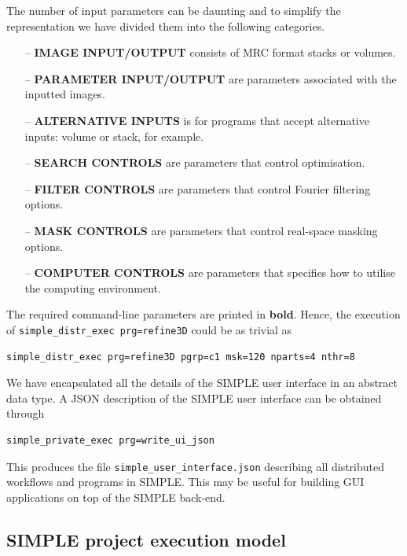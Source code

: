 \documentclass[a4paper,11pt]{article}
\begin{document}
\noindent{}The number of input parameters can be daunting and to simplify the representation we have divided them into the following categories.

\begin{itemize}
    \item[--] \textbf{IMAGE INPUT/OUTPUT} consists of MRC format stacks or volumes.
    \item[--] \textbf{PARAMETER INPUT/OUTPUT} are parameters associated with the inputted images.
    \item[--] \textbf{ALTERNATIVE INPUTS} is for programs that accept alternative inputs: volume or stack, for example.
    \item[--] \textbf{SEARCH CONTROLS} are parameters that control optimisation.
    \item[--] \textbf{FILTER CONTROLS} are parameters that control Fourier filtering options.
    \item[--] \textbf{MASK CONTROLS} are parameters that control real-space masking options.
    \item[--] \textbf{COMPUTER CONTROLS} are parameters that specifies how to utilise the computing environment.
\end{itemize}

\noindent{}The required command-line parameters are printed in \textbf{bold}. Hence, the execution of  \texttt{simple\_distr\_exec prg=refine3D} could be as trivial as

\begin{Verbatim}[commandchars=+\[\],fontsize=\small,breaklines=true]
simple_distr_exec prg=refine3D pgrp=c1 msk=120 nparts=4 nthr=8
\end{Verbatim}

\noindent{}We have encapsulated all the details of the SIMPLE user interface in an abstract data type. A JSON description of the SIMPLE user interface can be obtained through 

\begin{Verbatim}[commandchars=+\[\],fontsize=\small,breaklines=true]
simple_private_exec prg=write_ui_json
\end{Verbatim}

\noindent{}This produces the file \texttt{simple\_user\_interface.json} describing all distributed workflows and programs in SIMPLE. This may be useful for building GUI applications on top of the SIMPLE back-end.

\subsection{SIMPLE project execution model}
\end{document}
